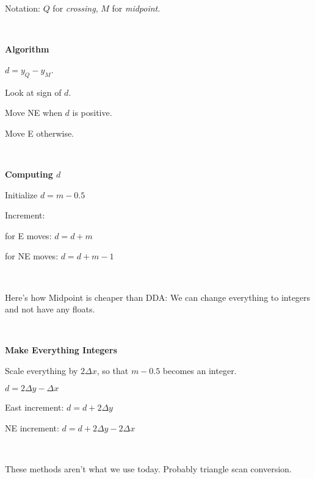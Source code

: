 \documentclass[12pt]{article}
\begin{document}
\begin{spacing}{1.2}
Notation:   $Q$ for {\it crossing}, $M$ for {\it midpoint}.

\

{\bf Algorithm}

$d = y_Q - y_M$.  

Look at sign of $d$.  

Move NE when $d$ is positive.

Move E otherwise.  

\

{\bf Computing $d$}

Initialize $d = m - 0.5$

Increment:

\qquad for E moves:  $d = d+m$

\qquad for NE moves:  $d = d + m - 1$

\

Here's how Midpoint is cheaper than DDA:  We can change everything to integers and not have any floats.  

\

{\bf Make Everything Integers}

Scale everything by $2 \Delta x$, so that $m - 0.5$ becomes an integer.  

$d = 2 \Delta y - \Delta x$

East increment:  $d = d + 2 \Delta y$

NE increment:  $d = d + 2 \Delta y - 2 \Delta x$

\

These methods aren't what we use today.  Probably triangle scan conversion.  




\end{spacing}
\end{document}

